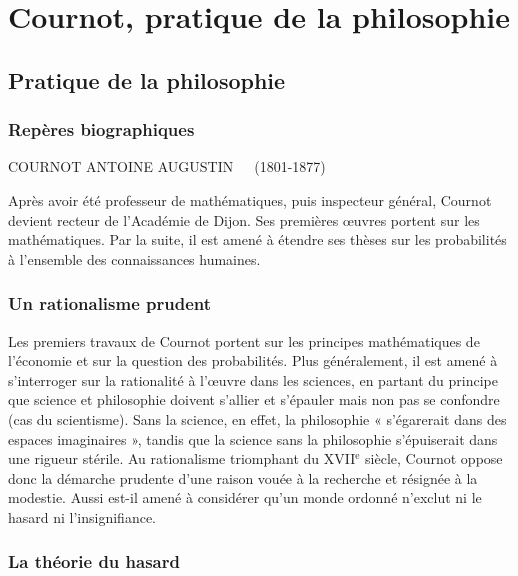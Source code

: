 
\chapter{Cournot, pratique de la philosophie}

\section{Pratique de la philosophie}

\subsection{Repères biographiques}

COURNOT ANTOINE AUGUSTIN\ \ \ (1801-1877)

\vspace{0.25cm}
Après avoir été professeur de mathématiques, puis inspecteur général,
Cournot devient recteur de l’Académie de Dijon. Ses premières œuvres
portent sur les mathématiques. Par la
suite, il est amené à étendre ses
thèses sur les probabilités à l’ensemble des connaissances humaines.

\subsection {Un rationalisme prudent}

Les premiers travaux de Cournot portent
sur les principes mathématiques de
l'économie et sur la question des probabilités. Plus généralement, il est
amené à s'interroger sur la rationalité à
l'œuvre dans les sciences, en partant du
principe que science et philosophie
doivent s’allier et s'épauler mais non pas
se confondre (cas du scientisme). Sans
la science, en effet, la philosophie
« s'égarerait dans des espaces imaginaires », tandis que la science sans la
philosophie s’épuiserait dans une
rigueur stérile. Au rationalisme triomphant du {\footnotesize XVII}$^\text{e}$ siècle, Cournot oppose
donc la démarche prudente d’une raison vouée à la recherche et résignée à
la modestie. Aussi est-il amené à considérer qu'un monde ordonné n'exclut ni
le hasard ni l’insignifiance.

\subsection {La théorie du hasard}

